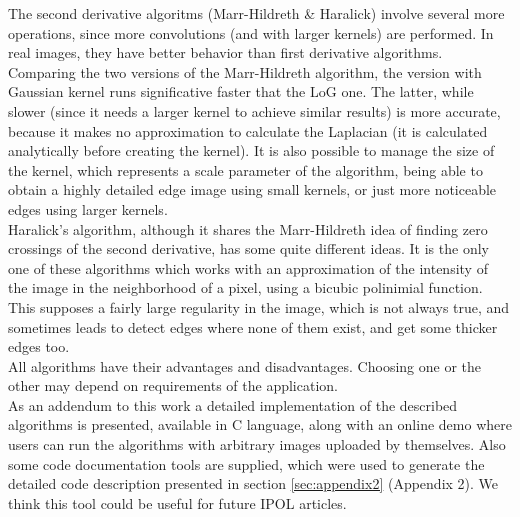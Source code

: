 \documentclass{ipol}
\numberwithin{equation}{section}
\numberwithin{table}{section}
\numberwithin{figure}{section}
\begin{document}
The second derivative algoritms (Marr-Hildreth \& Haralick) involve several more operations, since more convolutions (and with larger kernels) are performed. In real images, they have better behavior than first derivative algorithms. \\

Comparing the two versions of the Marr-Hildreth algorithm, the version with Gaussian kernel runs significative faster that the LoG one. The latter, while slower (since it needs a larger kernel to achieve similar results) is more accurate, because it makes no approximation to calculate the Laplacian (it is calculated analytically before creating the kernel). It is also possible to manage the size of the kernel, which represents a scale parameter of the algorithm, being able to obtain a highly detailed edge image using small kernels, or just more noticeable edges using larger kernels. \\

Haralick's algorithm, although it shares the Marr-Hildreth idea of finding zero crossings of the second derivative, has some quite different ideas. It is the only one of these algorithms which works with an approximation of the intensity of the image in the neighborhood of a pixel, using a bicubic polinimial function. This supposes a fairly large regularity in the image, which is not always true, and sometimes leads to detect edges where none of them exist, and get some thicker edges too. \\

All algorithms have their advantages and disadvantages. Choosing one or the other may depend on requirements of the application. \\ 


As an addendum to this work a detailed implementation of the described algorithms is presented, 
available in C language, along with an online demo where users can run the algorithms 
with arbitrary images uploaded by themselves. Also some code documentation tools are supplied, 
which were used to generate the detailed code description presented in section \ref{sec:appendix2} (Appendix 2). We think this tool could be useful for future IPOL articles. 

\clearpage




\end{document}
